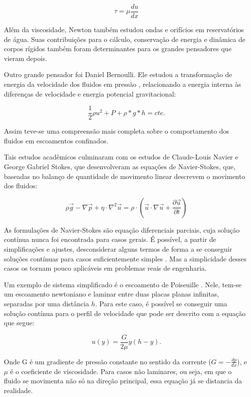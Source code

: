\begin{equation}
    \tau = \mu \frac{d u}{d x}
\end{equation}

Além da viscosidade, Newton também estudou ondas e orifícios em reservatórios de água. Suas contribuições para o cálculo, conservação de energia e dinâmica de corpos rígidos também foram determinantes para os grandes pensadores que vieram depois.

Outro grande pensador foi Daniel Bernoulli. Ele estudou a transformação de energia da velocidade dos fluidos em pressão \cite{1570009750104671360}, relacionando a energia interna às diferenças de velocidade e energia potencial gravitacional:

\begin{equation}
    \frac{1}{2}\rho u^2 + P + \rho * g * h = cte.
\end{equation}

Assim teve-se uma compreensão mais completa sobre o comportamento dos fluidos em escoamentos confinados.

Tais estudos acadêmicos culminaram com os estudos de  Claude-Louis Navier e George Gabriel Stokes, que desenvolveram as equações de Navier-Stokes, que, baseadas no balanço de quantidade de movimento linear descrevem o movimento dos fluidos:

\begin{equation}
\rho \vec{g}-\nabla \vec{p}+\eta \cdot \nabla^{2} \vec{u}=\rho \cdot\left(\vec{u} \cdot \nabla \vec{u}+\frac{\partial \vec{u}}{\partial t}\right)
\end{equation}

As formulações de Navier-Stokes são equação diferenciais parciais, cuja solução contínua nunca foi encontrada para casos gerais. É possível, a partir de simplificações e ajustes, desconsiderar alguns termos de forma a se conseguir soluções contínuas para casos suficientemente simples \cite{Cengel}. Mas a simplicidade desses casos os tornam pouco aplicáveis em problemas reais de engenharia.

Um exemplo de sistema simplificado é o escoamento de Poiseuille \cite{Poiseuille}. Nele, tem-se um escoamento newtoniano e laminar entre duas placas planas infinitas, separadas por uma distância $h$. Para este caso, é possível se conseguir uma solução contínua para o perfil de velocidade que pode ser descrito com a equação que segue:

\begin{equation}
  u(y) = \frac{G}{2\mu}y (h - y).
\end{equation}

Onde G é um gradiente de pressão constante no sentido da corrente ($G = -\frac{dp}{dx}$), e $\mu$ é o coeficiente de viscosidade. Para casos não laminares, ou seja, em que o fluido se movimenta não só na direção principal, essa equação já se distancia da realidade.
